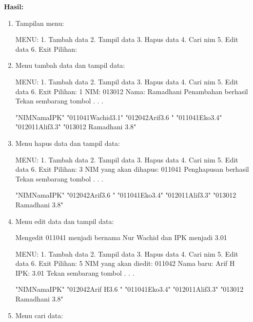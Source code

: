 \textbf{Hasil:}

\begin{enumerate}

\item
Tampilan menu:

 \begin{lcverbatim}
MENU:
1. Tambah data
2. Tampil data
3. Hapus data
4. Cari nim
5. Edit data
6. Exit
Pilihan:
 \end{lcverbatim}

\item
Menu tambah data dan tampil data:

 \begin{lcverbatim}
 MENU:
 1. Tambah data
 2. Tampil data
 3. Hapus data
 4. Cari nim
 5. Edit data
 6. Exit
 Pilihan: 1
 NIM: 013012
 Nama: Ramadhani
 Penambahan berhasil
 Tekan sembarang tombol . . .
 \end{lcverbatim}

\begin{lcverbatim}
"NIMNamaIPK"
"011041Wachid3.1"
"012042Arif3.6 "
"011041Eko3.4"
"012011Alif3.3"
"013012 Ramadhani 3.8"
\end{lcverbatim}
\item
Menu hapus data dan tampil data:

 \begin{lcverbatim}
MENU:
1. Tambah data
2. Tampil data
3. Hapus data
4. Cari nim
5. Edit data
6. Exit
Pilihan: 3
NIM yang akan dihapus: 011041
Penghapusan berhasil
Tekan sembarang tombol . . .
\end{lcverbatim}
\begin{lcverbatim}
"NIMNamaIPK"
"012042Arif3.6 "
"011041Eko3.4"
"012011Alif3.3"
"013012 Ramadhani 3.8"
\end{lcverbatim}

\item
Menu edit data dan tampil data:

Mengedit 011041 menjadi bernama
Nur Wachid dan IPK menjadi 3.01

\begin{lcverbatim}
MENU:
1. Tambah data
2. Tampil data
3. Hapus data
4. Cari nim
5. Edit data
6. Exit
Pilihan: 5
NIM yang akan diedit: 011042
Nama baru: Arif H
IPK: 3.01
Tekan sembarang tombol . . .
\end{lcverbatim}

\begin{lcverbatim}
"NIMNamaIPK"
"012042Arif H3.6 "
"011041Eko3.4"
"012011Alif3.3"
"013012 Ramadhani 3.8"
\end{lcverbatim}
\item
Menu cari data:


\end{enumerate}
